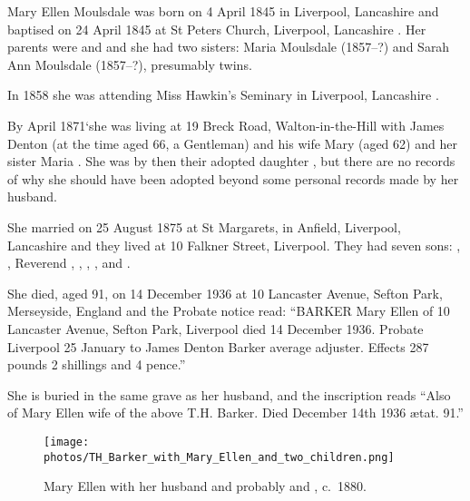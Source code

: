 
Mary Ellen Moulsdale was born on 4 April 1845 in Liverpool, Lancashire \cite{MEMoulsdaleBirth} and baptised on 24 April 1845 at St Peters Church, Liverpool, Lancashire \cite{MEMoulsdaleBaptism}. Her parents were  and  and she had two sisters: Maria Moulsdale (1857--?) and Sarah Ann Moulsdale (1857--?), presumably twins. 

In 1858 she was attending Miss Hawkin's Seminary in Liverpool, Lancashire \cite{MEMoulsdaleSchool}.

By April 1871`she was living at 19 Breck Road, Walton-in-the-Hill with James Denton (at the time aged 66, a Gentleman) and his wife Mary (aged 62) and her sister Maria \cite{MEMoulsdaleResidence}.  She was by then their adopted daughter \cite{MEMoulsdaleAdoption},  but there are no records of why she should have been adopted beyond some personal records made by her husband. 

She married  on 25 August 1875 at St Margarets, in Anfield, Liverpool, Lancashire \cite{MEMoulsdaleMarriage} and they lived at 10 Falkner Street, Liverpool.  They had seven sons: , , Reverend , , , , and .

She died, aged 91, on 14 December 1936 at 10 Lancaster Avenue, Sefton Park, Merseyside, England \cite{ToxtethBarker20} and the Probate notice read:
``BARKER Mary Ellen of 10 Lancaster Avenue, Sefton Park, Liverpool died 14 December 1936. Probate Liverpool 25 January to James Denton Barker average adjuster. Effects 287 pounds 2 shillings and 4 pence.''

She is buried in the same grave as her husband, and the inscription reads ``Also of Mary Ellen wife of the above T.H. Barker. Died December 14th 1936 \ae{}tat. 91.''\cite{THBgrave}

\begin{figure}
 \centering
 \texttt{[image: photos/TH\_Barker\_with\_Mary\_Ellen\_and\_two\_children.png]}
 \caption{Mary Ellen with her husband and probably  and , c.~1880.}
\end{figure}
